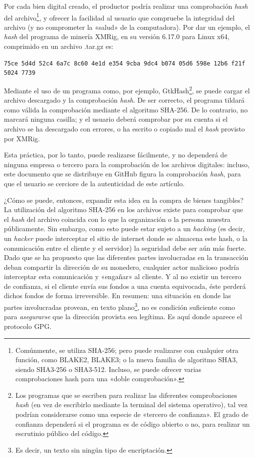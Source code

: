 \documentclass[12pt,a4paper]{article}
\begin{document}
Por cada bien digital creado, el productor podría realizar una comprobación \textit{hash} del archivo\footnote{Comúnmente, se utiliza SHA-256; pero puede realizarse con cualquier otra función, como BLAKE2, BLAKE3; o la nueva familia de algoritmo SHA3, siendo SHA3-256 o SHA3-512. Incluso, se puede ofrecer varias comprobaciones hash para una «doble comprobación».}, y ofrecer la facilidad al usuario que compruebe la integridad del archivo (y no comprometer la «salud» de la computadora). Por dar un ejemplo, el \textit{hash} del programa de minería XMRig, en su versión 6.17.0 para Linux x64, comprimido en un archivo .tar.gz es:

\begin{center}
\texttt{75ce 5d4d 52c4 6a7c 8c60 4e1d e354 9cba 9dc4 b074 05d6 598e 12b6 f21f 5024 7739}
\end{center}

Mediante el uso de un programa como, por ejemplo, GtkHash\footnote{Los programas que se escriben para realizar las diferentes comprobaciones \textit{hash} (en vez de escribirlo mediante la terminal del sistema operativo), tal vez podrían considerarse como una especie de «tercero de confianza». El grado de confianza dependerá si el programa es de código abierto o no, para realizar un escrutinio público del código.}, se puede cargar el archivo descargado y la comprobación \textit{hash}. De ser correcto, el programa tildará como válida la comprobación mediante el algoritmo SHA-256. De lo contrario, no marcará ninguna casilla; y el usuario deberá comprobar por su cuenta si el archivo se ha descargado con errores, o ha escrito o copiado mal el \textit{hash} provisto por XMRig.

Esta práctica, por lo tanto, puede realizarse fácilmente, y no dependerá de ninguna empresa o tercero para la comprobación de los archivos digitales: incluso, este documento que se distribuye en GitHub figura la comprobación \textit{hash}, para que el usuario se cerciore de la autenticidad de este artículo.

¿Cómo se puede, entonces, expandir esta idea en la compra de bienes tangibles? La utilización del algoritmo SHA-256 en los archivos existe para comprobar que el \textit{hash} del archivo coincida con lo que la organización o la persona muestra públicamente. Sin embargo, como esto puede estar sujeto a un \textit{hacking} (es decir, un \textit{hacker} puede interceptar el sitio de internet donde se almacena este hash, o la comunicación entre el cliente y el servidor) la seguridad debe ser aún más fuerte. Dado que se ha propuesto que las diferentes partes involucradas en la transacción deban compartir la dirección de su monedero, cualquier actor malicioso podría interceptar esta comunicación y «engañar» al cliente. Y al no existir un tercero de confianza, si el cliente envía sus fondos a una cuenta equivocada, éste perderá dichos fondos de forma irreversible. En resumen: una situación en donde las partes involucradas provean, en texto plano\footnote{Es decir, un texto sin ningún tipo de encriptación.}, no es condición suficiente como para \textit{asegurarse} que la dirección provista sea legítima. Es aquí donde aparece el protocolo GPG.
\end{document}
